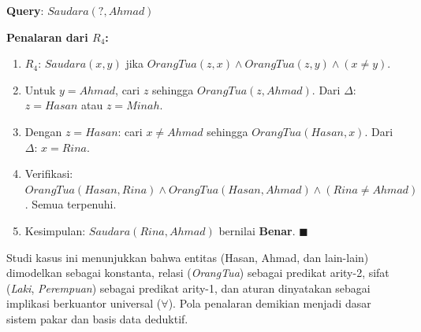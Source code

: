 \begin{contoh}
\textbf{Query}: $Saudara(?, Ahmad)$

\textbf{Penalaran dari $R_4$:}
\begin{enumerate}
    \item $R_4$: $Saudara(x, y)$ jika $OrangTua(z, x) \wedge OrangTua(z, y) \wedge (x \neq y)$.
    \item Untuk $y = Ahmad$, cari $z$ sehingga $OrangTua(z, Ahmad)$. Dari $\Delta$: $z = Hasan$ atau $z = Minah$.
    \item Dengan $z = Hasan$: cari $x \neq Ahmad$ sehingga $OrangTua(Hasan, x)$. Dari $\Delta$: $x = Rina$.
    \item Verifikasi: $OrangTua(Hasan, Rina) \wedge OrangTua(Hasan, Ahmad) \wedge (Rina \neq Ahmad)$. Semua terpenuhi.
    \item Kesimpulan: $Saudara(Rina, Ahmad)$ bernilai \textbf{Benar}. $\blacksquare$
\end{enumerate}
\end{contoh}

\begin{konsep}
Studi kasus ini menunjukkan bahwa entitas (Hasan, Ahmad, dan lain-lain) dimodelkan sebagai konstanta, relasi (\textit{OrangTua}) sebagai predikat arity-2, sifat (\textit{Laki}, \textit{Perempuan}) sebagai predikat arity-1, dan aturan dinyatakan sebagai implikasi berkuantor universal ($\forall$). Pola penalaran demikian menjadi dasar sistem pakar dan basis data deduktif.
\end{konsep}
